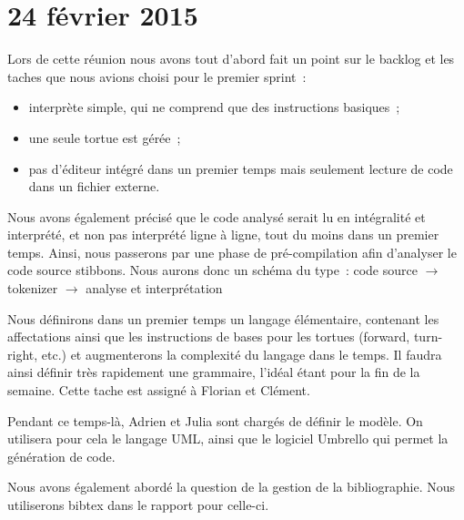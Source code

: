 \section{24 février 2015}

Lors de cette réunion nous avons tout d'abord fait un point sur le backlog et les taches que nous avions choisi pour le premier sprint~:
\begin{itemize}
\item interprète simple, qui ne comprend que des instructions basiques~;
\item une seule tortue est gérée~;
\item pas d'éditeur intégré dans un premier temps mais seulement lecture de code dans un fichier externe.
\end{itemize}
Nous avons également précisé que le code analysé serait lu en intégralité et interprété, et non pas interprété ligne à ligne, tout du moins dans un premier temps.
Ainsi, nous passerons par une phase de pré-compilation afin d'analyser le code source stibbons. Nous aurons donc un schéma du type~:
code source $\rightarrow$ tokenizer $\rightarrow$ analyse et interprétation

Nous définirons dans un premier temps un langage élémentaire, contenant les affectations ainsi que les instructions de bases pour les tortues (forward, turn-right, etc.) et augmenterons la complexité du langage dans le temps.
Il faudra ainsi définir très rapidement une grammaire, l'idéal étant pour la fin de la semaine. Cette tache est assigné à Florian et Clément.

Pendant ce temps-là, Adrien et Julia sont chargés de définir le modèle. On utilisera pour cela le langage UML, ainsi que le logiciel Umbrello qui permet la génération de code.

Nous avons également abordé la question de la gestion de la bibliographie. Nous utiliserons bibtex dans le rapport pour celle-ci.
